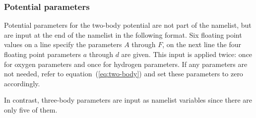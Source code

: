 \documentclass[12pt,a4paper]{article}
\begin{document}
\subsubsection*{Potential parameters}

Potential parameters for the two-body potential are not part of the namelist,
but are input at the end of the namelist in the following format.  Six floating
point values on a line specify the parameters $A$ through $F$, on the next line
the four floating point parameters $a$ through $d$ are given.  This input is
applied twice: once for oxygen parameters and once for hydrogen parameters.  If
any parameters are not needed, refer to equation~(\ref{eq:two-body}) and set
these parameters to zero accordingly.

In contrast, three-body parameters are input as namelist variables since there
are only five of them.




\end{document}
